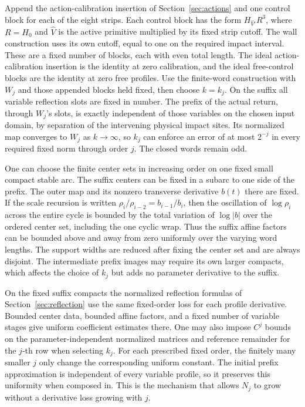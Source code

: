 \documentclass[11pt]{article}
\begin{document}
Append the action-calibration insertion of
Section~\ref{sec:actions} and one control block for each of the eight
strips. Each control block has the form \(H_{\widehat V'}R^3\), where
\(R=H_0\) and \(\widehat V\) is the active primitive multiplied by its
fixed strip cutoff. The wall construction uses its own cutoff, equal
to one on the required impact interval. These are a fixed number of
blocks, each with even
total length. The ideal action-calibration insertion is the identity at zero
calibration, and the ideal free-control blocks are the identity at zero free
profiles. Use the finite-word construction with \(W_j\) and those appended
blocks held fixed, then choose \(k=k_j\). On the suffix all variable reflection
slots are fixed in number. The prefix of the actual return, through \(W_j\)'s
slots, is exactly independent of those variables on the chosen input domain, by
separation of the intervening physical impact sites. Its normalized map
converges to \(W_j\) as \(k\to\infty\), so \(k_j\) can enforce an error of at
most \(2^{-j}\) in every required fixed norm through order \(j\). The closed
words remain odd.

One can choose the finite center sets in increasing order on one fixed small
compact stable arc. The suffix centers can be fixed in a subarc to one side of
the prefix. The outer map and its nonzero transverse derivative \(b(t)\) there
are fixed. If the scale recursion is written \(\rho_i/\rho_{i-2}=b_{i-1}/b_i\),
then the oscillation of \(\log\rho_i\) across the entire cycle is bounded by the
total variation of \(\log|b|\) over the ordered center set, including the one
cyclic wrap. Thus the suffix affine factors can be bounded above and away from
zero uniformly over the varying word lengths. The support widths are reduced
after fixing the center set and are always disjoint. The intermediate prefix
images may require its own larger compacts, which affects the choice of \(k_j\)
but adds no parameter derivative to the suffix.

On the fixed suffix compacts the normalized reflection formulas of
Section~\ref{sec:reflection} use the same fixed-order loss for
each profile derivative. Bounded center data, bounded affine factors, and a
fixed number of variable stages give uniform coefficient estimates there. One
may also impose \(C^j\) bounds on the parameter-independent normalized matrices
and reference remainder for the \(j\)-th row when selecting \(k_j\). For each
prescribed fixed order, the finitely many smaller \(j\) only change the
corresponding uniform constant. The initial prefix approximation is independent
of every variable profile, so it preserves this uniformity when composed in.
This is the mechanism that allows \(N_j\) to grow without a derivative loss
growing with \(j\).
\end{document}
